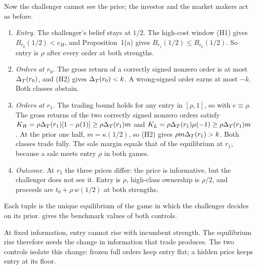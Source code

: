 Now the challenger cannot see the price; the investor and the market makers act as before.
\begin{enumerate}[leftmargin=2em]
\item \emph{Entry.} The challenger's belief stays at \(1/2\). The high-cost window (H1) gives \(B_{r_0}(1/2)<c_H\), and
Proposition~1(a) gives \(B_{r_1}(1/2)\le B_{r_0}(1/2)\). So entry is \(\rho\) after every order at both strengths.
\item \emph{Orders at \(r_0\).} The gross return of a correctly signed nonzero order is at most \(\Delta_T(r_0)\), and (H2)
gives \(\Delta_T(r_0)<k\). A wrong-signed order earns at most \(-k\). Both classes abstain.
\item \emph{Orders at \(r_1\).} The trading bound holds for any entry in \([\rho,1]\), so with \(e\equiv\rho\). The gross
returns of the two correctly signed nonzero orders satisfy \(K_H=\rho\Delta_T(r_1)[1-\mu(1)]\ge\rho\Delta_T(r_1)m\) and
\(K_L=\rho\Delta_T(r_1)\mu(-1)\ge\rho\Delta_T(r_1)m\). At the prior one half, \(m=\kappa(1/2)\), so (H2) gives
\(\rho m\Delta_T(r_1)>k\). Both classes trade fully. The sale margin equals that of the equilibrium at \(r_1\), because a
sale meets entry \(\rho\) in both games.
\item \emph{Outcome.} At \(r_1\) the three prices differ: the price is informative, but the challenger does not see
it. Entry is \(\rho\), high-class ownership is \(\rho/2\), and proceeds are \(t_0+\rho\,w(1/2)\) at both strengths.
\end{enumerate}
Each tuple is the unique equilibrium of the game in which the challenger decides on its prior.
 gives the benchmark values of both controls.

\begin{resultbox}
At fixed information, entry cannot rise with incumbent strength.
The equilibrium rise therefore needs the change in information that trade produces.
The two controls isolate this change: frozen full orders keep entry flat; a hidden price keeps entry at its floor.
\end{resultbox}
